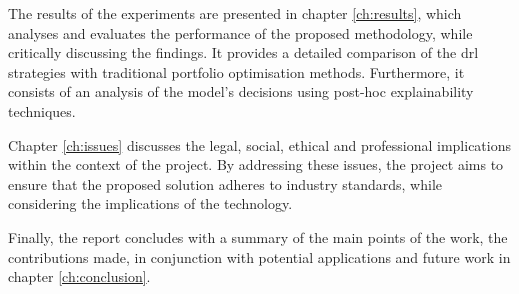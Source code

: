 The results of the experiments are presented in chapter \ref{ch:results}, which analyses and evaluates the performance of the proposed methodology, while critically discussing the findings. It provides a detailed comparison of the \acrshort{drl} strategies with traditional portfolio optimisation methods. Furthermore, it consists of an analysis of the model's decisions using post-hoc explainability techniques.

Chapter \ref{ch:issues} discusses the legal, social, ethical and professional implications within the context of the project. By addressing these issues, the project aims to ensure that the proposed solution adheres to industry standards, while considering the implications of the technology.

Finally, the report concludes with a summary of the main points of the work, the contributions made, in conjunction with potential applications and future work in chapter \ref{ch:conclusion}.

